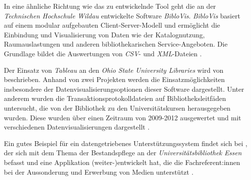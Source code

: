 In eine ähnliche Richtung wie das zu entwickelnde Tool geht die an der \textit{Technischen Hochschule Wildau} entwickelte Software \textit{BibloVis}.
\textit{BibloVis} basiert auf einem modular aufgebauten Client-Server-Modell und ermöglicht die Einbindung und Visualisierung von Daten wie
der Katalognutzung, Raumauslastungen und  anderen bibliothekarischen Service-Angeboten. Die Grundlage bildet die Auswertungen von \textit{\acrshort{CSV}}-
und \textit{\acrshort{XML}}-Dateien \cite{block_biblovis_2015}.



Der Einsatz von \textit{Tableau} an den \textit{Ohio State University Libraries} wird von  beschrieben. 
Anhand von zwei Projekten werden die Einsatzmöglichkeiten insbesondere der Datenvisualisierungsoptionen 
dieser Software dargestellt. Unter anderem wurden die Transaktionsprotokolldateien auf Bibliotheksleitfäden untersucht, 
die von der Bibliothek zu den Universitätskursen herausgegeben wurden.  Diese wurden über einen Zeitraum von 2009-2012 ausgewertet und 
mit verschiedenen Datenvisualisierungen dargestellt \cite[vgl.][469 f.]{murphy_data_2013}.

Ein gutes Beispiel für ein datengetriebenes Unterstützungssystem findet sich bei , der sich mit dem Thema der Bestandspflege an der
\textit{Universitätsbibliothek Essen} befasst und eine Applikation (weiter-)entwickelt hat, die
die Fachreferent:innen bei der Aussonderung und Erwerbung von Medien
unterstützt \cite{spielberg_eike_t_fachref-assistent_nodate}.


